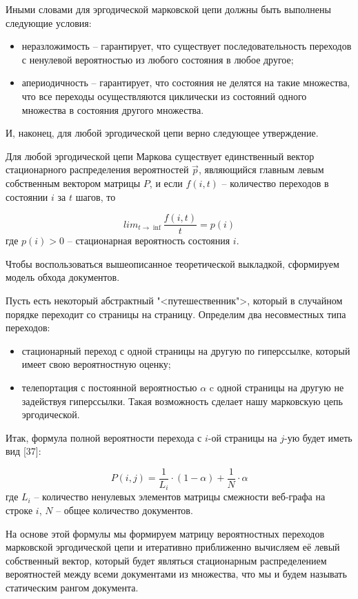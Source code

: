 Иными словами для эргодической марковской цепи должны быть выполнены следующие условия:
\begin{itemize}
\item неразложимость -- гарантирует, что существует последовательность переходов с ненулевой вероятностью из любого состояния в любое другое;
\item апериодичность -- гарантирует, что состояния не делятся на такие множества, что все переходы осуществляются циклически из состояний одного множества в состояния другого множества.
\end{itemize}

И, наконец, для любой эргодической цепи верно следующее утверждение.

Для любой эргодической цепи Маркова существует единственный вектор стационарного распределения вероятностей $\vec{p}$, являющийся главным левым собственным вектором матрицы $P$, и если $f(i, t)$ -- количество переходов в состоянии $i$ за $t$ шагов, то 

\begin{equation}
lim_{t \to \inf}\frac{f(i, t)}{t}=p(i)
\end{equation} где $p(i) > 0$ -- стационарная вероятность состояния $i$.

Чтобы воспользоваться вышеописанное теоретической выкладкой, сформируем модель обхода документов.

Пусть есть некоторый абстрактный "<путешественник">, который в случайном порядке переходит со страницы на страницу.
Определим два несовместных типа переходов:
\begin{itemize}
\item стационарный переход с одной страницы на другую по гиперссылке, который имеет свою вероятностную оценку;
\item телепортация с постоянной вероятностью $\alpha$ c одной страницы на другую не задействуя гиперссылки. Такая возможность сделает нашу марковскую цепь эргодической.
\end{itemize}

Итак, формула полной вероятности перехода с $i$-ой страницы на $j$-ую будет иметь вид [37]:

\begin{equation}
P(i, j) = \frac{1}{L_i} \cdot (1 - \alpha) + \frac{1}{N} \cdot \alpha
\end{equation} где $L_i$ -- количество ненулевых элементов матрицы смежности веб-графа на строке $i$, $N$ -- общее количество документов.

На основе этой формулы мы формируем матрицу вероятностных переходов марковской эргодической цепи и итеративно приближенно вычисляем её левый собственный вектор, который будет являться стационарным распределением вероятностей между всеми документами из множества, что мы и будем называть статическим рангом документа.

